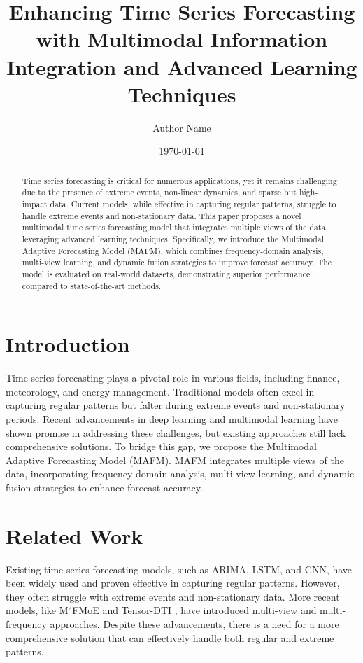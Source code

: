 \documentclass{article}
\title{Enhancing Time Series Forecasting with Multimodal Information Integration and Advanced Learning Techniques}
\author{Author Name}
\date{\today}
\begin{document}
\maketitle

\begin{abstract}
Time series forecasting is critical for numerous applications, yet it remains challenging due to the presence of extreme events, non-linear dynamics, and sparse but high-impact data. Current models, while effective in capturing regular patterns, struggle to handle extreme events and non-stationary data. This paper proposes a novel multimodal time series forecasting model that integrates multiple views of the data, leveraging advanced learning techniques. Specifically, we introduce the Multimodal Adaptive Forecasting Model (MAFM), which combines frequency-domain analysis, multi-view learning, and dynamic fusion strategies to improve forecast accuracy. The model is evaluated on real-world datasets, demonstrating superior performance compared to state-of-the-art methods.
\end{abstract}

\section{Introduction}
Time series forecasting plays a pivotal role in various fields, including finance, meteorology, and energy management. Traditional models often excel in capturing regular patterns but falter during extreme events and non-stationary periods. Recent advancements in deep learning and multimodal learning have shown promise in addressing these challenges, but existing approaches still lack comprehensive solutions. To bridge this gap, we propose the Multimodal Adaptive Forecasting Model (MAFM). MAFM integrates multiple views of the data, incorporating frequency-domain analysis, multi-view learning, and dynamic fusion strategies to enhance forecast accuracy.

\section{Related Work}
Existing time series forecasting models, such as ARIMA, LSTM, and CNN, have been widely used and proven effective in capturing regular patterns. However, they often struggle with extreme events and non-stationary data. More recent models, like M$^2$FMoE \cite{huang2026m2fmoemultiresolutionmultiviewfrequency} and Tensor-DTI \cite{gilsorribes2026tensordtienhancingbiomolecularinteraction}, have introduced multi-view and multi-frequency approaches. Despite these advancements, there is a need for a more comprehensive solution that can effectively handle both regular and extreme patterns.
\end{document}
